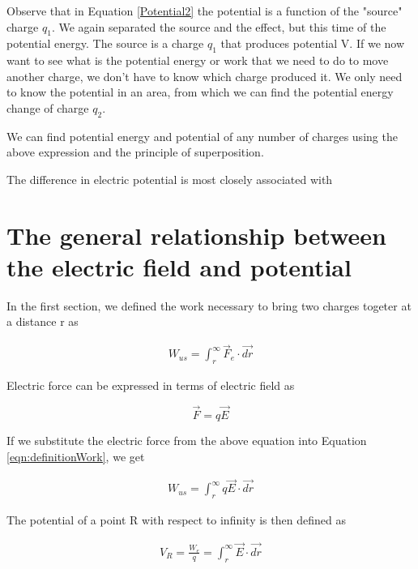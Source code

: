\documentclass{ximera}
\begin{document}
Observe that in Equation \ref{Potential2} the potential is a function of the "source" charge $q_1$. We again separated the source and the effect, but this time of the potential energy. The source is a charge $q_1$ that produces potential V. If we now want to see what is the potential energy or work that we need to do to move another charge, we don't have to know which charge produced it. We only need to know the potential in an area, from which we can find the potential energy change of charge $q_2$. 

We can find potential energy and potential of any number of charges using the above expression and the principle of superposition. 


\begin{question}  
The difference in electric potential is most closely associated with 
\begin{multipleChoice}  
\end{multipleChoice}  
\end{question}

\section{The general relationship between the electric field and potential}

In the first section, we defined the work necessary to bring two charges togeter at a distance r as 

\begin{eqnarray}
W_{us}=  \int_{r}^{\infty} \vec{F}_{e} \cdot \vec{dr}\label{eqn:definitionWork} 
\end{eqnarray}

Electric force can be expressed in terms of electric field as

\begin{equation}
\vec{F}=q \vec{E}
\end{equation}

If we substitute the electric force from the above equation into Equation \ref{eqn:definitionWork}, we get 

\begin{eqnarray}
W_{us}=  \int_{r}^{\infty} q \vec{E} \cdot \vec{dr}
\end{eqnarray}

The potential of a point R with respect to infinity is then defined as 

\begin{eqnarray}
V_R=\frac{W_{e}}{q}=\int_{r}^{\infty}  \vec{E} \cdot \vec{dr}
\end{eqnarray}
\end{document}
